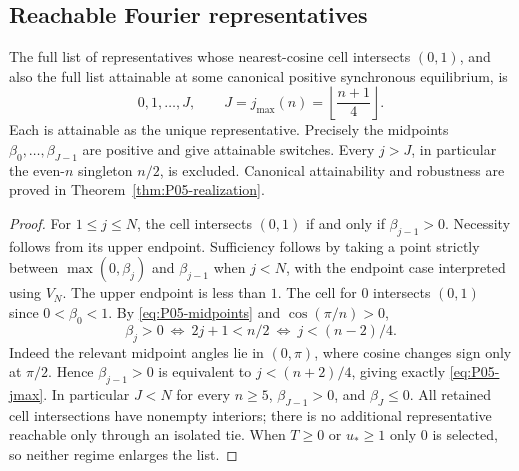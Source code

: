 \subsection{Reachable Fourier representatives}

\begin{theorem}
\label{thm:P05-reachable}
The full list of representatives whose nearest-cosine cell intersects
$(0,1)$, and also the full list attainable at some canonical positive
synchronous equilibrium, is
\begin{equation}
 \boxed{0,1,\ldots,J,\qquad J=j_{\max}(n)=\left\lfloor\frac{n+1}{4}\right\rfloor.}
 \label{eq:P05-jmax}
\end{equation}
Each is attainable as the unique representative. Precisely the midpoints
$\beta_0,\ldots,\beta_{J-1}$ are positive and give attainable switches.
Every $j>J$, in particular the even-$n$ singleton $n/2$, is excluded.
Canonical attainability and robustness are proved in Theorem~\ref{thm:P05-realization}.
\end{theorem}
\begin{proof}
For $1\le j\le N$, the cell intersects $(0,1)$ if and only if
$\beta_{j-1}>0$. Necessity follows from its upper endpoint. Sufficiency
follows by taking a point strictly between
$\max(0,\beta_j)$ and $\beta_{j-1}$ when $j<N$, with the endpoint
case interpreted using $V_N$. The upper endpoint is less than $1$.
The cell for $0$ intersects $(0,1)$ since $0<\beta_0<1$.
By \eqref{eq:P05-midpoints} and $\cos(\pi/n)>0$,
\[
 \beta_j>0\ \Longleftrightarrow\ 2j+1<n/2
 \ \Longleftrightarrow\ j<(n-2)/4.
\]
Indeed the relevant midpoint angles lie in $(0,\pi)$, where cosine
changes sign only at $\pi/2$. Hence
$\beta_{j-1}>0$ is equivalent to $j<(n+2)/4$, giving exactly
\eqref{eq:P05-jmax}. In particular $J<N$ for every $n\ge5$,
$\beta_{J-1}>0$, and $\beta_J\le0$. All retained cell intersections
have nonempty interiors; there is no additional representative reachable
only through an isolated tie. When $T\ge0$ or $u_*\ge1$ only $0$
is selected, so neither regime enlarges the list.
\end{proof}

